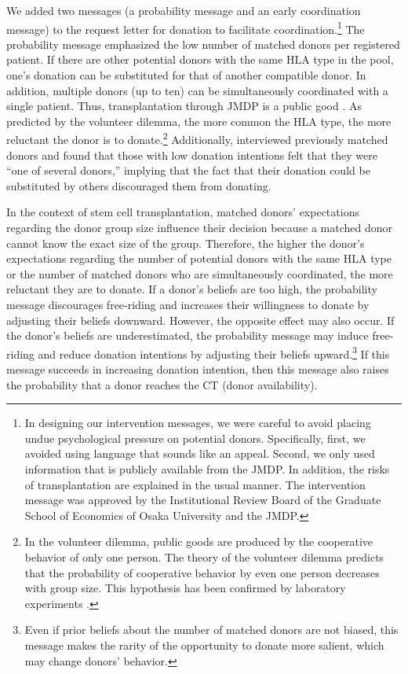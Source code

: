 \documentclass[12pt, a4paper]{article}
\begin{document}
We added two messages (a probability message and an early coordination message) to the request letter for donation to facilitate coordination.\footnote{In designing our intervention messages, we were careful to avoid placing undue psychological pressure on potential donors. Specifically, first, we avoided using language that sounds like an appeal. Second, we only used information that is publicly available from the JMDP. In addition, the risks of transplantation are explained in the usual manner. The intervention message was approved by the Institutional Review Board of the Graduate School of Economics of Osaka University and the JMDP.} The probability message emphasized the low number of matched donors per registered patient. If there are other potential donors with the same HLA type in the pool, one's donation can be substituted for that of another compatible donor. In addition, multiple donors (up to ten) can be simultaneously coordinated with a single patient. Thus, transplantation through JMDP is a public good \citep{Bergstrom2009}. As predicted by the volunteer dilemma, the more common the HLA type, the more reluctant the donor is to donate.\footnote{In the volunteer dilemma, public goods are produced by the cooperative behavior of only one person. The theory of the volunteer dilemma predicts that the probability of cooperative behavior by even one person decreases with group size. This hypothesis has been confirmed by laboratory experiments \citep{Diekmann1985, Diekmann1986, Franzen1999, Davis2017}.} Additionally, \citet{Kurosawa2022} interviewed previously matched donors and found that those with low donation intentions felt that they were ``one of several donors,'' implying that the fact that their donation could be substituted by others discouraged them from donating.

In the context of stem cell transplantation, matched donors' expectations regarding the donor group size influence their decision because a matched donor cannot know the exact size of the group. Therefore, the higher the donor's expectations regarding the number of potential donors with the same HLA type or the number of matched donors who are simultaneously coordinated, the more reluctant they are to donate. If a donor's beliefs are too high, the probability message discourages free-riding and increases their willingness to donate by adjusting their beliefs downward. However, the opposite effect may also occur. If the donor's beliefs are underestimated, the probability message may induce free-riding and reduce donation intentions by adjusting their beliefs upward.\footnote{Even if prior beliefs about the number of matched donors are not biased, this message makes the rarity of the opportunity to donate more salient, which may change donors' behavior.} If this message succeeds in increasing donation intention, then this message also raises the probability that a donor reaches the CT (donor availability).
\end{document}
